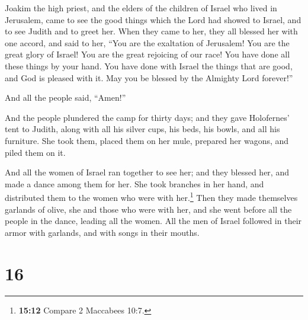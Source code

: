  Joakim the high priest, and the elders of the children of
Israel who lived in Jerusalem, came to see the good things which the
Lord had showed to Israel, and to see Judith and to greet her.
 When they came to her, they all blessed her with one
accord, and said to her, ``You are the exaltation of Jerusalem! You are
the great glory of Israel! You are the great rejoicing of our race!
 You have done all these things by your hand. You have
done with Israel the things that are good, and God is pleased with it.
May you be blessed by the Almighty Lord forever!''

And all the people said, ``Amen!''

 And the people plundered the camp for thirty days; and
they gave Holofernes' tent to Judith, along with all his silver cups,
his beds, his bowls, and all his furniture. She took them, placed them
on her mule, prepared her wagons, and piled them on it.

 And all the women of Israel ran together to see her; and
they blessed her, and made a dance among them for her. She took branches
in her hand, and distributed them to the women who were with
her.\footnote{\textbf{15:12} Compare 2 Maccabees 10:7.} 
Then they made themselves garlands of olive, she and those who were with
her, and she went before all the people in the dance, leading all the
women. All the men of Israel followed in their armor with garlands, and
with songs in their mouths.

\hypertarget{section-15}{%
\section{16}\label{section-15}}

